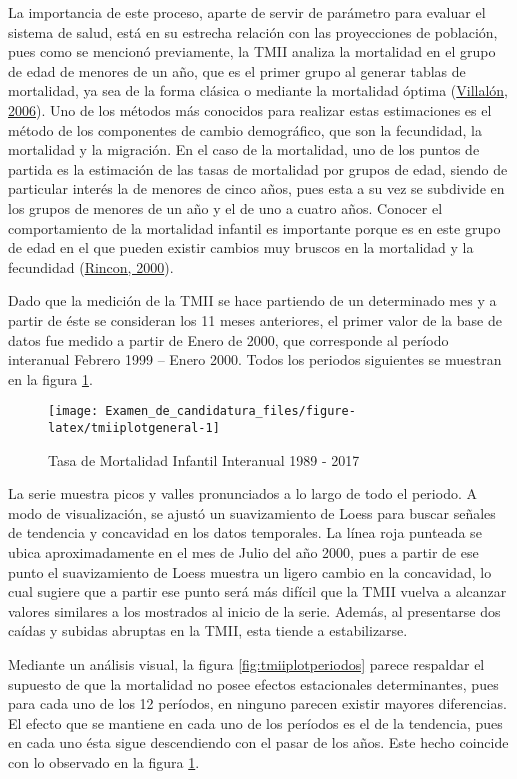 \documentclass[
]{article}
\begin{document}
La importancia de este proceso, aparte de servir de parámetro para
evaluar el sistema de salud, está en su estrecha relación con las
proyecciones de población, pues como se mencionó previamente, la TMII
analiza la mortalidad en el grupo de edad de menores de un año, que es
el primer grupo al generar tablas de mortalidad, ya sea de la forma
clásica o mediante la mortalidad óptima
(\protect\hyperlink{ref-mortalidad_optima}{Villalón, 2006}). Uno de los
métodos más conocidos para realizar estas estimaciones es el método de
los componentes de cambio demográfico, que son la fecundidad, la
mortalidad y la migración. En el caso de la mortalidad, uno de los
puntos de partida es la estimación de las tasas de mortalidad por grupos
de edad, siendo de particular interés la de menores de cinco años, pues
esta a su vez se subdivide en los grupos de menores de un año y el de
uno a cuatro años. Conocer el comportamiento de la mortalidad infantil
es importante porque es en este grupo de edad en el que pueden existir
cambios muy bruscos en la mortalidad y la fecundidad
(\protect\hyperlink{ref-Rincon}{Rincon, 2000}).

Dado que la medición de la TMII se hace partiendo de un determinado mes
y a partir de éste se consideran los 11 meses anteriores, el primer
valor de la base de datos fue medido a partir de Enero de 2000, que
corresponde al período interanual Febrero 1999 -- Enero 2000. Todos los
periodos siguientes se muestran en la figura \ref{fig:tmiiplotgeneral}.

\begin{figure}[H]
\texttt{[image: Examen\_de\_candidatura\_files/figure-latex/tmiiplotgeneral-1]} \caption{Tasa de Mortalidad Infantil Interanual 1989 - 2017}\label{fig:tmiiplotgeneral}
\end{figure}

La serie muestra picos y valles pronunciados a lo largo de todo el
periodo. A modo de visualización, se ajustó un suavizamiento de Loess
para buscar señales de tendencia y concavidad en los datos temporales.
La línea roja punteada se ubica aproximadamente en el mes de Julio del
año 2000, pues a partir de ese punto el suavizamiento de Loess muestra
un ligero cambio en la concavidad, lo cual sugiere que a partir ese
punto será más difícil que la TMII vuelva a alcanzar valores similares a
los mostrados al inicio de la serie. Además, al presentarse dos caídas y
subidas abruptas en la TMII, esta tiende a estabilizarse.

Mediante un análisis visual, la figura \ref{fig:tmiiplotperiodos} parece
respaldar el supuesto de que la mortalidad no posee efectos estacionales
determinantes, pues para cada uno de los 12 períodos, en ninguno parecen
existir mayores diferencias. El efecto que se mantiene en cada uno de
los períodos es el de la tendencia, pues en cada uno ésta sigue
descendiendo con el pasar de los años. Este hecho coincide con lo
observado en la figura \ref{fig:tmiiplotgeneral}.
\end{document}
